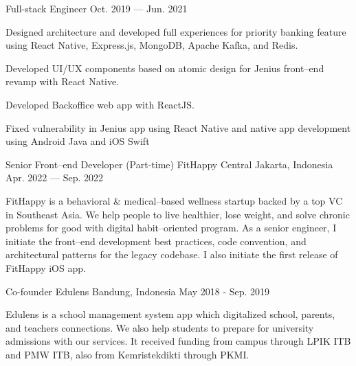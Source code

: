 \begin{cventries}
  \cventry
    {Full-stack Engineer} %
    {} %
    {} %
    {Oct. 2019 --- Jun. 2021} %
    {
      \begin{cvitems} %
        \item {Designed architecture and developed full experiences for priority banking feature using React Native, Express.js, MongoDB, Apache Kafka, and Redis.}
        \item {Developed UI/UX components based on atomic design for Jenius front--end revamp with React Native.}
        \item {Developed Backoffice web app with ReactJS.}
        \item {Fixed vulnerability in Jenius app using React Native and native app development using Android Java and iOS Swift}
      \end{cvitems}
    }

  \cventry
    {Senior Front--end Developer (Part-time)} %
    {FitHappy} %
    {Central Jakarta, Indonesia} %
    {Apr. 2022 --- Sep. 2022} %
    {
      \begin{cvitems} 
        FitHappy is a behavioral \& medical--based wellness startup backed by a top VC in Southeast Asia. 
        We help people to live healthier, lose weight, and solve chronic problems for good with digital habit--oriented program. 
        As a senior engineer, I initiate the front--end development best practices, code convention, and architectural patterns for the legacy codebase. 
        I also initiate the first release of FitHappy iOS app.
      \end{cvitems}
    }
    

  \cventry
    {Co-founder} %
    {Edulens} %
    {Bandung, Indonesia} %
    {May 2018 - Sep. 2019} %
    {
      \begin{cvitems} %
        Edulens is a school management system app which digitalized school, parents, and teachers connections. 
        We also help students to prepare for university admissions with our services. 
        It received funding from campus through LPIK ITB and PMW ITB, also from Kemristekdikti through PKMI.
      \end{cvitems}
    }


\end{cventries}
